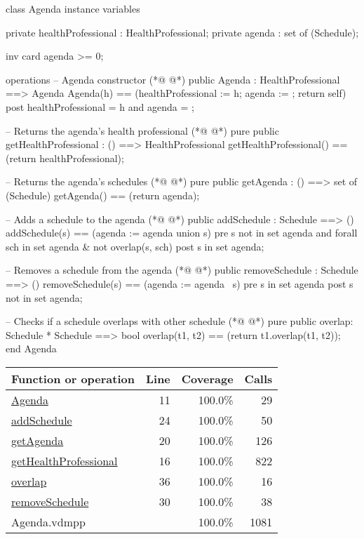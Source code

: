 \begin{vdmpp}[breaklines=true]
class Agenda
instance variables

private healthProfessional : HealthProfessional;
private agenda : set of (Schedule);

inv card agenda >= 0;

operations
 -- Agenda constructor
(*@
\label{Agenda:11}
@*)
 public Agenda : HealthProfessional ==> Agenda
  Agenda(h) == (healthProfessional := h; agenda := {}; return self)
 post healthProfessional = h and agenda = {};
 
 -- Returns the agenda's health professional
(*@
\label{getHealthProfessional:16}
@*)
 pure public getHealthProfessional : () ==> HealthProfessional
  getHealthProfessional() == (return healthProfessional);
 
 -- Returns the agenda's schedules
(*@
\label{getAgenda:20}
@*)
 pure public getAgenda : () ==> set of (Schedule)
  getAgenda() == (return agenda);
 
 -- Adds a schedule to the agenda
(*@
\label{addSchedule:24}
@*)
 public addSchedule : Schedule ==> ()
  addSchedule(s) == (agenda := agenda union {s})
 pre s not in set agenda and forall sch in set agenda & not overlap(s, sch)
 post s in set agenda;
 
 -- Removes a schedule from the agenda
(*@
\label{removeSchedule:30}
@*)
 public removeSchedule : Schedule ==> ()
  removeSchedule(s) == (agenda := agenda \ {s})
 pre s in set agenda
 post s not in set agenda;
 
 -- Checks if a schedule overlaps with other schedule
(*@
\label{overlap:36}
@*)
 pure public overlap: Schedule * Schedule ==> bool
  overlap(t1, t2) == (return t1.overlap(t1, t2));
end Agenda
\end{vdmpp}
\bigskip
\begin{longtable}{|l|r|r|r|}
\hline
Function or operation & Line & Coverage & Calls \\
\hline
\hline
\hyperref[Agenda:11]{Agenda} & 11&100.0\% & 29 \\
\hline
\hyperref[addSchedule:24]{addSchedule} & 24&100.0\% & 50 \\
\hline
\hyperref[getAgenda:20]{getAgenda} & 20&100.0\% & 126 \\
\hline
\hyperref[getHealthProfessional:16]{getHealthProfessional} & 16&100.0\% & 822 \\
\hline
\hyperref[overlap:36]{overlap} & 36&100.0\% & 16 \\
\hline
\hyperref[removeSchedule:30]{removeSchedule} & 30&100.0\% & 38 \\
\hline
\hline
Agenda.vdmpp & & 100.0\% & 1081 \\
\hline
\end{longtable}

